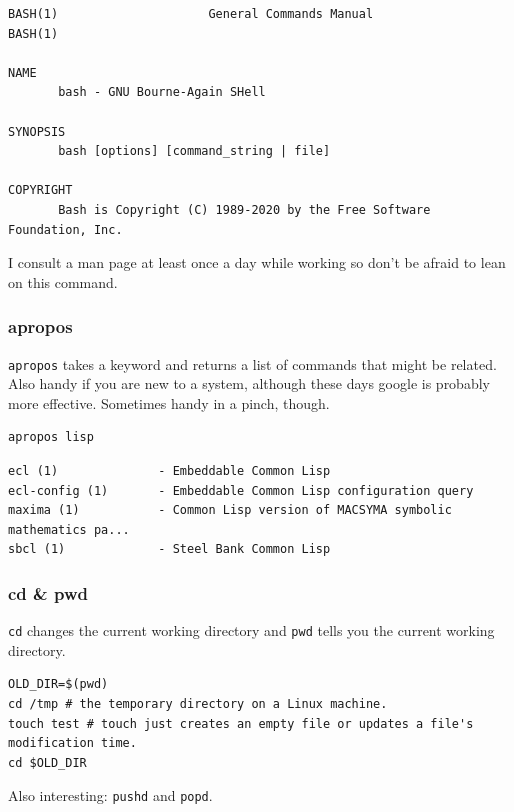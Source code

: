 \documentclass[11pt]{article}
\begin{document}
\begin{verbatim}
BASH(1)                     General Commands Manual                    BASH(1)

NAME
       bash - GNU Bourne-Again SHell

SYNOPSIS
       bash [options] [command_string | file]

COPYRIGHT
       Bash is Copyright (C) 1989-2020 by the Free Software Foundation, Inc.
\end{verbatim}

I consult a man page at least once a day while working so don't be
afraid to lean on this command.

\subsubsection{apropos}
\label{sec:orged62698}

\texttt{apropos} takes a keyword and returns a list of commands that might be
related. Also handy if you are new to a system, although these days
google is probably more effective. Sometimes handy in a pinch, though.

\begin{verbatim}
apropos lisp
\end{verbatim}

\begin{verbatim}
ecl (1)              - Embeddable Common Lisp
ecl-config (1)       - Embeddable Common Lisp configuration query
maxima (1)           - Common Lisp version of MACSYMA symbolic mathematics pa...
sbcl (1)             - Steel Bank Common Lisp
\end{verbatim}

\subsubsection{cd \& pwd}
\label{sec:orge2dba8b}

\texttt{cd} changes the current working directory and \texttt{pwd} tells you the
current working directory.

\begin{verbatim}
OLD_DIR=$(pwd)
cd /tmp # the temporary directory on a Linux machine.
touch test # touch just creates an empty file or updates a file's modification time.
cd $OLD_DIR
\end{verbatim}

Also interesting: \texttt{pushd} and \texttt{popd}.
\end{document}
